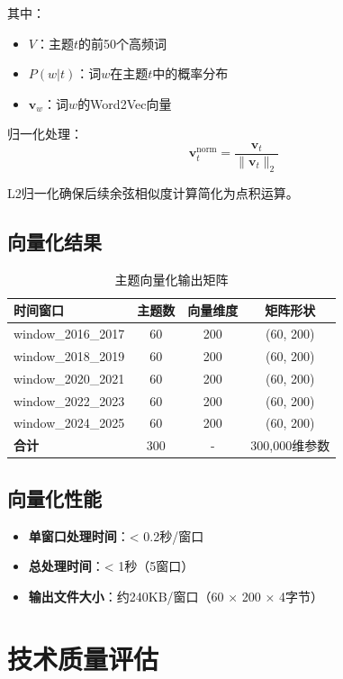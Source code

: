 \documentclass[11pt,a4paper]{article}
\begin{document}
其中：
\begin{itemize}
    \item $V$：主题$t$的前50个高频词
    \item $P(w|t)$：词$w$在主题$t$中的概率分布
    \item $\mathbf{v}_w$：词$w$的Word2Vec向量
\end{itemize}

归一化处理：
\begin{equation}
\mathbf{v}_t^{\text{norm}} = \frac{\mathbf{v}_t}{\|\mathbf{v}_t\|_2}
\end{equation}

L2归一化确保后续余弦相似度计算简化为点积运算。

\subsection{向量化结果}

\begin{table}[h]
\centering
\begin{tabular}{lccc}
\toprule
\textbf{时间窗口} & \textbf{主题数} & \textbf{向量维度} & \textbf{矩阵形状} \\
\midrule
window\_2016\_2017 & 60 & 200 & (60, 200) \\
window\_2018\_2019 & 60 & 200 & (60, 200) \\
window\_2020\_2021 & 60 & 200 & (60, 200) \\
window\_2022\_2023 & 60 & 200 & (60, 200) \\
window\_2024\_2025 & 60 & 200 & (60, 200) \\
\midrule
\textbf{合计} & 300 & - & 300,000维参数 \\
\bottomrule
\end{tabular}
\caption{主题向量化输出矩阵}
\end{table}

\subsection{向量化性能}

\begin{itemize}
    \item \textbf{单窗口处理时间}：< 0.2秒/窗口
    \item \textbf{总处理时间}：< 1秒（5窗口）
    \item \textbf{输出文件大小}：约240KB/窗口（60 × 200 × 4字节）
\end{itemize}

\section{技术质量评估}
\end{document}
